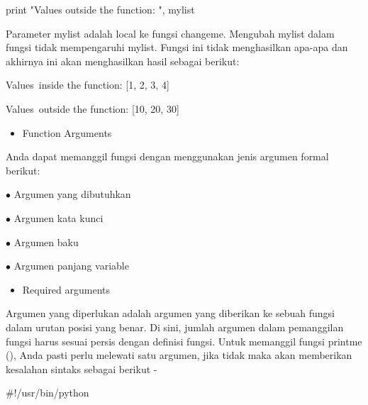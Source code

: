 \noindent 
 \hspace*{0.5in} print "Values outside the function: ", mylist \par
\vspace{\baselineskip}
\noindent 
Parameter mylist adalah local ke fungsi changeme. Mengubah mylist dalam fungsi tidak mempengaruhi mylist. Fungsi ini tidak menghasilkan apa-apa dan akhirnya ini akan menghasilkan hasil sebagai berikut: \par
\vspace{\baselineskip}
\noindent 
 \hspace*{0.5in} Values~inside the function:  [1, 2, 3, 4] \par
\noindent 
 \hspace*{0.5in} Values~outside the function:  [10, 20, 30] \par
\vspace{12pt}
\noindent 
\begin{itemize}
	\item Function Arguments 
\end{itemize}
\noindent 
Anda dapat memanggil fungsi dengan menggunakan jenis argumen formal berikut: \par
\noindent 
 \hspace*{0.5in}  $ \bullet $ Argumen yang dibutuhkan \par
\noindent 
 \hspace*{0.5in}  $ \bullet $ Argumen kata kunci \par
\noindent 
 \hspace*{0.5in}  $ \bullet $ Argumen baku \par
\noindent 
 \hspace*{0.5in}  $ \bullet $ Argumen panjang variable \par
\vspace{12pt}
\noindent 
\begin{itemize}
	\item Required arguments
\end{itemize}
\noindent 
Argumen yang diperlukan adalah argumen yang diberikan ke sebuah fungsi dalam urutan posisi yang benar. Di sini, jumlah argumen dalam pemanggilan fungsi harus sesuai persis dengan definisi fungsi. Untuk memanggil fungsi printme (), Anda pasti perlu melewati satu argumen, jika tidak maka akan memberikan kesalahan sintaks sebagai berikut - \par
\vspace{\baselineskip}
\noindent 
 \hspace*{0.5in}  $  \#  $!/usr/bin/python \par
